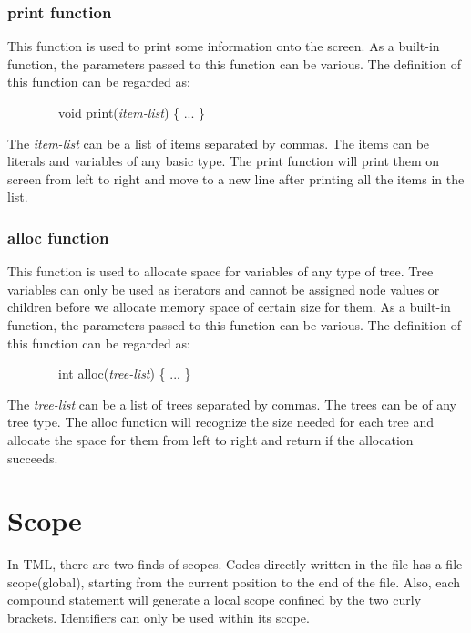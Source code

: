 \documentclass[12pt,psfig,a4]{article}
\begin{document}
\subsubsection{print function}
This function is used to print some information onto the screen.
As a built-in function, the parameters passed to this function can be various. The definition of this function can be regarded as:
\begin{code}
\begin{tabbing}
~~~~~~~~void print(\textsl{item-list}) \{ ... \}
\end{tabbing}
\end{code}

The \textsl{item-list} can be a list of items separated by commas. The items can be literals and variables of any basic type. The print function will print them on screen from left to right and move to a new line after printing all the items in the list.

\subsubsection{alloc function}
This function is used to allocate space for variables of any type of tree.
Tree variables can only be used as iterators and cannot be assigned node values or children before we allocate memory space of certain size for them.
As a built-in function, the parameters passed to this function can be various. The definition of this function can be regarded as:
\begin{code}
\begin{tabbing}
~~~~~~~~int alloc(\textsl{tree-list}) \{ ... \}
\end{tabbing}
\end{code}

The \textsl{tree-list} can be a list of trees separated by commas. The trees can be of any tree type. The alloc function will recognize the size needed for each tree and allocate the space for them from left to right and return if the allocation succeeds.

\section{Scope}
In TML, there are two finds of scopes. Codes directly written in the file has a file scope(global), starting from the current position to the end of the file. Also, each compound statement will generate a local scope confined by the two curly brackets. Identifiers can only be used within its scope.
\end{document}
